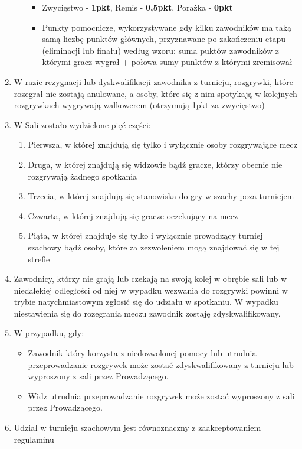 \begin{enumerate}
\begin{enumerate}
\begin{itemize}
	\item Zwycięstwo - \textbf{1pkt}, Remis - \textbf{0,5pkt}, Porażka - \textbf{0pkt}
	\item Punkty pomocnicze, wykorzystywane gdy kilku zawodników ma taką samą liczbę punktów głównych, przyznawane po zakończeniu etapu (eliminacji lub finału) według wzoru: suma puktów zawodników z którymi gracz wygrał + połowa sumy punktów z którymi zremisował
\end{itemize}
\end{enumerate}
\item W razie rezygnacji lub dyskwalifikacji zawodnika z turnieju, rozgrywki, które rozegrał nie zostają anulowane, a osoby, które się z nim spotykają w kolejnych rozgrywkach wygrywają walkowerem (otrzymują 1pkt za zwycięstwo)
\item W Sali zostało wydzielone pięć części:
\begin{enumerate}
\item Pierwsza, w której znajdują się tylko i wyłącznie osoby rozgrywające mecz
\item Druga, w której znajdują się widzowie bądź gracze, którzy obecnie nie rozgrywają żadnego spotkania
\item Trzecia, w której znajdują się stanowiska do gry w szachy poza turniejem
\item Czwarta, w której znajdują się gracze oczekujący na mecz
\item Piąta, w której znajduje się tylko i wyłącznie prowadzący turniej szachowy bądź osoby, które za zezwoleniem mogą znajdować się w tej strefie
\end{enumerate}
\item Zawodnicy, którzy nie grają lub czekają na swoją kolej w obrębie sali lub w niedalekiej odległości od niej w wypadku wezwania do rozgrywki powinni w trybie natychmiastowym zgłosić się do udziału w spotkaniu. W wypadku niestawienia się do rozegrania meczu zawodnik zostaję zdyskwalifikowany.
\item W przypadku, gdy:
\begin{itemize}
\item Zawodnik który korzysta z niedozwolonej pomocy lub utrudnia przeprowadzanie rozgrywek  może zostać zdyskwalifikowany z turnieju lub wyproszony z sali przez Prowadzącego.
\item Widz utrudnia przeprowadzanie rozgrywek może zostać wyproszony z sali przez Prowadzącego.
\end{itemize}
\item Udział w turnieju szachowym jest równoznaczny z zaakceptowaniem regulaminu
\end{enumerate}

